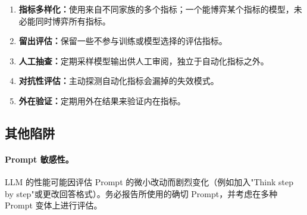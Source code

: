 \begin{keybox}
\begin{enumerate}
  \item \textbf{指标多样化：}使用来自不同家族的多个指标；一个能博弈某个指标的模型，未必能同时博弈所有指标。
  \item \textbf{留出评估：}保留一些不参与训练或模型选择的评估指标。
  \item \textbf{人工抽查：}定期采样模型输出供人工审阅，独立于自动化指标之外。
  \item \textbf{对抗性评估：}主动探测自动化指标会漏掉的失效模式。
  \item \textbf{外在验证：}定期用外在结果来验证内在指标。
\end{enumerate}
\end{keybox}

\subsection{其他陷阱}
\label{additional-pitfalls}

\paragraph{Prompt 敏感性。}
\label{prompt-sensitivity.}

LLM 的性能可能因评估 Prompt 的微小改动而剧烈变化（例如加入"Think step by step"或更改回答格式）。务必报告所使用的确切 Prompt，并考虑在多种 Prompt 变体上进行评估。


